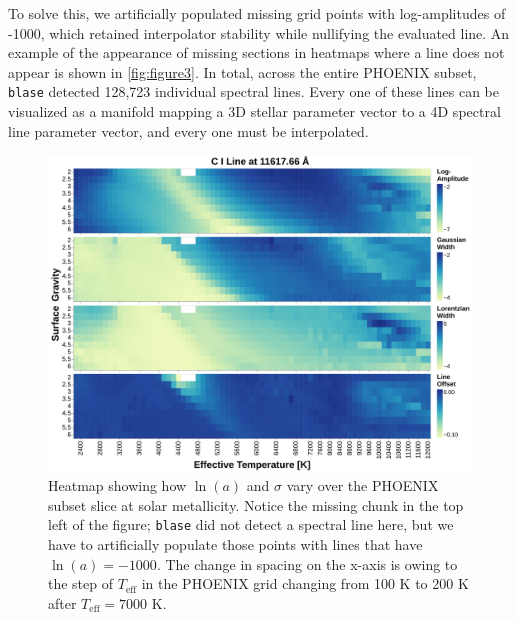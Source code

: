 \documentclass[twocolumn]{aastex631}
\begin{document}
To solve this, we artificially populated missing grid points with log-amplitudes of -1000, which retained interpolator stability while nullifying the evaluated line. 
An example of the appearance of missing sections in heatmaps where a line does not appear is shown in \autoref{fig:figure3}. 
In total, across the entire PHOENIX subset, \texttt{blase} detected 128,723 individual spectral lines.  
Every one of these lines can be visualized as a manifold mapping a 3D stellar parameter vector to a 4D spectral line parameter vector, and every one must be interpolated.
\begin{figure}
    \centering
    \includegraphics[width=\textwidth]{figure3}
    \caption{Heatmap showing how $\ln(a)$ and $\sigma$ vary over the PHOENIX subset slice at solar metallicity. 
    Notice the missing chunk in the top left of the figure; \texttt{blase} did not detect a spectral line here, but we have to artificially populate those points with lines that have $\ln(a) = -1000$. 
    The change in spacing on the x-axis is owing to the step of $T_\mathrm{eff}$ in the PHOENIX grid changing from 100 K to 200 K after $T_\mathrm{eff} = 7000$ K.}
    \label{fig:figure3}
\end{figure}
\end{document}
